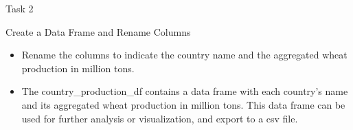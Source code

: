 \documentclass[
  ignorenonframetext,
  aspectratio=169,
]{beamer}
\begin{document}
\begin{frame}[fragile]{Task 2}
\linespread{2}

\linespread{0.5}

\linespread{2}

\linespread{0.5}

\linespread{2}

\linespread{0.5}

\linespread{2}
\end{frame}

\begin{frame}{Create a Data Frame and Rename Columns}
\protect\hypertarget{create-a-data-frame-and-rename-columns}{}
\begin{itemize}[<+->]
\item
  Rename the columns to indicate the country name and the aggregated
  wheat production in million tons.
\item
  The country\_production\_df contains a data frame with each country's
  name and its aggregated wheat production in million tons. This data
  frame can be used for further analysis or visualization, and export to
  a csv file.
\end{itemize}
\end{frame}
\end{document}
